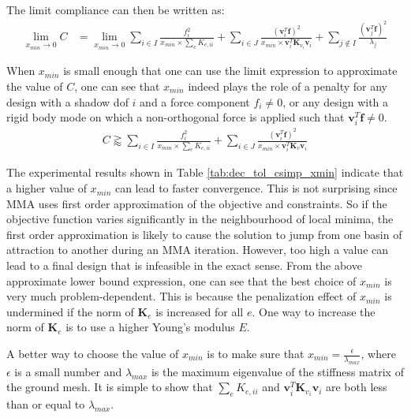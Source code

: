   The limit compliance can then be written as:
  \begin{align}
    \lim_{x_{min} \to 0} C & = \lim_{x_{min} \to 0} \sum_{i \in I} \frac{f_i^2}{x_{min} \times \sum_e K_{e,ii}} + \sum_{i \in J} \frac{(\bm{v}_i^T \bm{f})^2}{x_{min} \times \bm{v}_i^T \bm{K}_{v_i} \bm{v}_i} + \sum_{j \notin I} \frac{(\bm{v}_j^T \bm{f})^2}{\lambda_j}
  \end{align}

  When $x_{min}$ is small enough that one can use the limit expression to approximate the value of $C$, one can see that $x_{min}$ indeed plays the role of a penalty for any design with a shadow dof $i$ and a force component $f_i \neq 0$, or any design with a rigid body mode on which a non-orthogonal force is applied such that $\bm{v}_i^T \bm{f} \neq 0$.
  \begin{align}
    C \gtrapprox \sum_{i \in I} \frac{f^2_i}{x_{min} \times \sum_e K_{e,ii}} + \sum_{i \in J} \frac{(\bm{v}_i^T \bm{f})^2}{x_{min} \times \bm{v}_i^T \bm{K}_v \bm{v}_i}
  \end{align}

  The experimental results shown in Table \ref{tab:dec_tol_csimp_xmin} indicate that a higher value of $x_{min}$ can lead to faster convergence. This is not surprising since MMA uses first order approximation of the objective and constraints. So if the objective function varies significantly in the neighbourhood of local minima, the first order approximation is likely to cause the solution to jump from one basin of attraction to another during an MMA iteration. However, too high a value can lead to a final design that is infeasible in the exact sense. From the above approximate lower bound expression, one can see that the best choice of $x_{min}$ is very much problem-dependent. This is because the penalization effect of $x_{min}$ is undermined if the norm of $\bm{K}_e$ is increased for all $e$. One way to increase the norm of $\bm{K}_e$ is to use a higher Young's modulus $E$.

  A better way to choose the value of $x_{min}$ is to make sure that $x_{min} = \frac{\epsilon}{\lambda_{max}}$, where $\epsilon$ is a small number and $\lambda_{max}$ is the maximum eigenvalue of the stiffness matrix of the ground mesh. It is simple to show that $\sum_e K_{e,ii}$ and $\bm{v}_i^T \bm{K}_{v_i} \bm{v}_i$ are both less than or equal to $\lambda_{max}$. 

